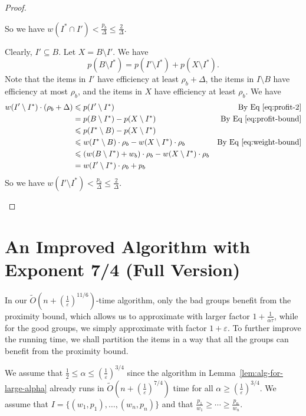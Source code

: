 \documentclass[a4paper,UKenglish,cleveref, autoref, thm-restate, pdfa]{lipics-v2021}
\newcommand{\eps}{\varepsilon}
\renewcommand{\leq}{\leqslant}
\renewcommand{\geq}{\geqslant}
\begin{document}
\begin{proof}
\begin{romanenumerate}
        So we have $w(I^*\cap I') < \frac{p_b}{\Delta}\leq \frac{2}{\Delta}$.
        \item 
        Clearly, $I' \subseteq B$. Let $X = B \setminus I'$. We have 
        \begin{equation}
            p(B\setminus I^*) = p(I'\setminus I^*) + p(X\setminus I^*)\label{eq:profit-2}.
        \end{equation}
        Note that the items in $I'$ have efficiency at least $\rho_b + \Delta$, the items in $I\setminus B$ have efficiency at most $\rho_b$, and the items in $X$ have efficiency at least $\rho_b$.  We have
        \begin{align*}
            w(I'\setminus I^*)\cdot (\rho_b+\Delta) &\leq  p(I'\setminus I^*)\qquad\qquad\qquad&\text{By Eq~\eqref{eq:profit-2}}\\
            &=p(B\setminus I^*)-p(X\setminus I^*)\qquad\qquad\qquad &\text{By Eq~\eqref{eq:profit-bound}}\\
            &\leq p(I^*\setminus B)-p(X\setminus I^*) \\
            &\leq w(I^*\setminus B)\cdot\rho_b-w(X\setminus I^*)\cdot \rho_b \quad &\text{By Eq~\eqref{eq:weight-bound}}\\
            &\leq (w(B\setminus I^*)+w_b)\cdot\rho_b-w(X\setminus I^*)\cdot \rho_b  \\
            & =w(I'\setminus I^*)\cdot \rho_b+p_b
        \end{align*}
        So we have $w(I'\setminus I^*) < \frac{p_b}{\Delta} \leq \frac{2}{\Delta}$. \qedhere
    \end{romanenumerate}
\end{proof}




\section{An Improved Algorithm with Exponent 7/4 (Full Version)}\label{app:strong}
In our $\tilde{O}(n + (\frac{1}{\eps})^{11/6})$-time algorithm, only the bad groups benefit from the proximity bound, which allows us to approximate with larger factor $1 + \frac{1}{\alpha\tau}$, while for the good groups, we simply approximate with factor $1 + \eps$. To further improve the running time, we shall partition the items in a way that all the groups can benefit from the proximity bound.

We assume that $\frac{1}{2}\leq \alpha \leq (\frac{1}{\eps})^{3/4}$ since the algorithm in Lemma~\ref{lem:alg-for-large-alpha} already runs in $\tilde{O}(n + (\frac{1}{\eps})^{7/4})$ time for all $\alpha \geq (\frac{1}{\eps})^{3/4}$. We assume that $I = \{(w_1, p_1), \ldots, (w_n, p_n)\}$ and that $\frac{p_1}{w_1} \geq \cdots \geq \frac{p_n}{w_n}$.
\end{document}
